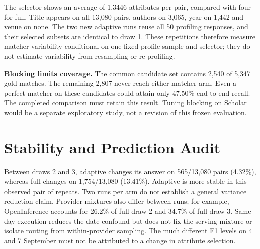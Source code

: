 \documentclass[11pt]{article}
\begin{document}
The selector shows an average of 1.3446 attributes per pair, compared with four
for full. Title appears on all 13,080 pairs, authors on 3,065, year on 1,442 and
venue on none. The two new adaptive runs reuse all 50 profiling responses, and
their selected subsets are identical to draw 1. These repetitions therefore
measure matcher variability conditional on one fixed profile sample and selector;
they do not estimate variability from resampling or re-profiling.

\textbf{Blocking limits coverage.} The common candidate set contains 2,540 of
5,347 gold matches. The remaining 2,807 never reach either matcher arm. Even a
perfect matcher on these candidates could attain only 47.50\% end-to-end recall.
The completed comparison must retain this result. Tuning blocking on Scholar
would be a separate exploratory study, not a revision of this frozen evaluation.

\section{Stability and Prediction Audit}
Between draws 2 and 3, adaptive changes its answer on 565/13,080 pairs (4.32\%),
whereas full changes on 1,754/13,080 (13.41\%). Adaptive is more stable in this
observed pair of repeats. Two runs per arm do not establish a general variance
reduction claim. Provider mixtures also differ between runs; for example,
OpenInference accounts for 26.2\% of full draw 2 and 34.7\% of full draw 3.
Same-day execution reduces the date confound but does not fix the serving mixture
or isolate routing from within-provider sampling. The much different F1 levels
on 4 and 7 September must not be attributed to a change in attribute selection.
\end{document}
